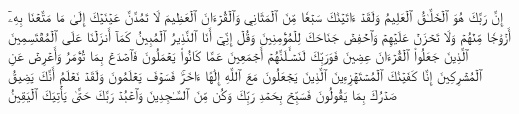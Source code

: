 إِنَّ رَبَّكَ هُوَ ٱلۡخَلَّـٰقُ ٱلۡعَلِيمُ
وَلَقَدۡ ءَاتَيۡنَٰكَ سَبۡعٗا مِّنَ ٱلۡمَثَانِي وَٱلۡقُرۡءَانَ ٱلۡعَظِيمَ
لَا تَمُدَّنَّ عَيۡنَيۡكَ إِلَىٰ مَا مَتَّعۡنَا بِهِۦٓ أَزۡوَٰجٗا مِّنۡهُمۡ وَلَا تَحۡزَنۡ عَلَيۡهِمۡ وَٱخۡفِضۡ جَنَاحَكَ لِلۡمُؤۡمِنِينَ
وَقُلۡ إِنِّيٓ أَنَا ٱلنَّذِيرُ ٱلۡمُبِينُ
كَمَآ أَنزَلۡنَا عَلَى ٱلۡمُقۡتَسِمِينَ
ٱلَّذِينَ جَعَلُواْ ٱلۡقُرۡءَانَ عِضِينَ
فَوَرَبِّكَ لَنَسۡـَٔلَنَّهُمۡ أَجۡمَعِينَ
عَمَّا كَانُواْ يَعۡمَلُونَ
فَٱصۡدَعۡ بِمَا تُؤۡمَرُ وَأَعۡرِضۡ عَنِ ٱلۡمُشۡرِكِينَ
إِنَّا كَفَيۡنَٰكَ ٱلۡمُسۡتَهۡزِءِينَ
ٱلَّذِينَ يَجۡعَلُونَ مَعَ ٱللَّهِ إِلَٰهًا ءَاخَرَۚ فَسَوۡفَ يَعۡلَمُونَ
وَلَقَدۡ نَعۡلَمُ أَنَّكَ يَضِيقُ صَدۡرُكَ بِمَا يَقُولُونَ
فَسَبِّحۡ بِحَمۡدِ رَبِّكَ وَكُن مِّنَ ٱلسَّـٰجِدِينَ
وَٱعۡبُدۡ رَبَّكَ حَتَّىٰ يَأۡتِيَكَ ٱلۡيَقِينُ